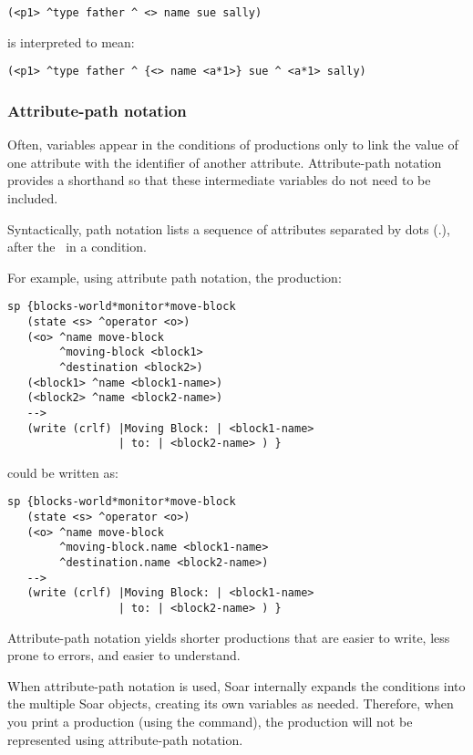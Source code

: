 \begin{verbatim}
(<p1> ^type father ^ <> name sue sally)
\end{verbatim}

is interpreted to mean:

\begin{verbatim}
(<p1> ^type father ^ {<> name <a*1>} sue ^ <a*1> sally)
\end{verbatim}


\subsubsection{Attribute-path notation}
\label{SYNTAX-pm-path}

Often, variables appear in the conditions of productions only to link the value
of one attribute with the identifier of another attribute. Attribute-path
notation provides a shorthand so that these intermediate variables do not need
to be included.

Syntactically, path notation lists a sequence of attributes separated by dots
(.), after the \carat \ in a condition.

For example, using attribute path notation, the production:

\begin{verbatim}
sp {blocks-world*monitor*move-block
   (state <s> ^operator <o>)
   (<o> ^name move-block
        ^moving-block <block1>
        ^destination <block2>)
   (<block1> ^name <block1-name>)
   (<block2> ^name <block2-name>)   
   -->
   (write (crlf) |Moving Block: | <block1-name>
                 | to: | <block2-name> ) }
\end{verbatim}

could be written as:

\begin{verbatim}
sp {blocks-world*monitor*move-block
   (state <s> ^operator <o>)
   (<o> ^name move-block
        ^moving-block.name <block1-name>
        ^destination.name <block2-name>)   
   -->
   (write (crlf) |Moving Block: | <block1-name>
                 | to: | <block2-name> ) }
\end{verbatim}

Attribute-path notation yields shorter productions that are easier to
write, less prone to errors, and easier to understand.

When attribute-path notation is used, Soar internally expands the conditions
into the multiple Soar objects, creating its own variables as needed.
Therefore, when you print a production (using the  command), the
production will not be represented using attribute-path notation.


